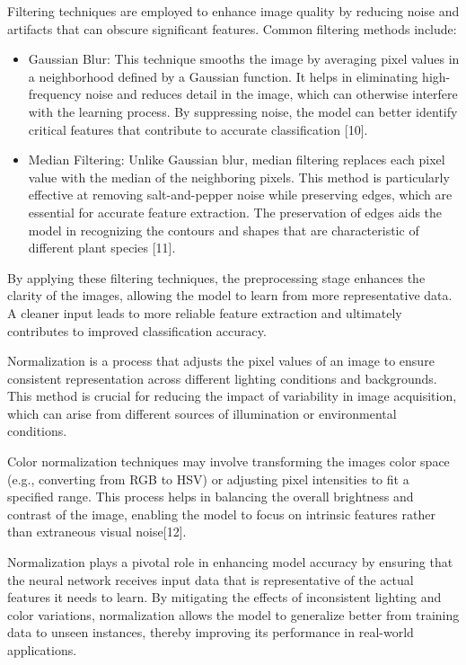 \documentclass[
]{article}
\begin{document}
Filtering techniques are employed to enhance image quality by reducing
noise and artifacts that can obscure significant features. Common
filtering methods include:

\begin{itemize}
\item
  Gaussian Blur: This technique smooths the image by averaging pixel
  values in a neighborhood defined by a Gaussian function. It helps in
  eliminating high-frequency noise and reduces detail in the image,
  which can otherwise interfere with the learning process. By
  suppressing noise, the model can better identify critical features
  that contribute to accurate classification {[}10{]}.
\item
  Median Filtering: Unlike Gaussian blur, median filtering replaces each
  pixel value with the median of the neighboring pixels. This method is
  particularly effective at removing salt-and-pepper noise while
  preserving edges, which are essential for accurate feature extraction.
  The preservation of edges aids the model in recognizing the contours
  and shapes that are characteristic of different plant species
  {[}11{]}.
\end{itemize}

By applying these filtering techniques, the preprocessing stage enhances
the clarity of the images, allowing the model to learn from more
representative data. A cleaner input leads to more reliable feature
extraction and ultimately contributes to improved classification
accuracy.

Normalization is a process that adjusts the pixel values of an image to
ensure consistent representation across different lighting conditions
and backgrounds. This method is crucial for reducing the impact of
variability in image acquisition, which can arise from different sources
of illumination or environmental conditions.

Color normalization techniques may involve transforming the
image\textquotesingle s color space (e.g., converting from RGB to HSV)
or adjusting pixel intensities to fit a specified range. This process
helps in balancing the overall brightness and contrast of the image,
enabling the model to focus on intrinsic features rather than extraneous
visual noise{[}12{]}.

Normalization plays a pivotal role in enhancing model accuracy by
ensuring that the neural network receives input data that is
representative of the actual features it needs to learn. By mitigating
the effects of inconsistent lighting and color variations, normalization
allows the model to generalize better from training data to unseen
instances, thereby improving its performance in real-world applications.
\end{document}
